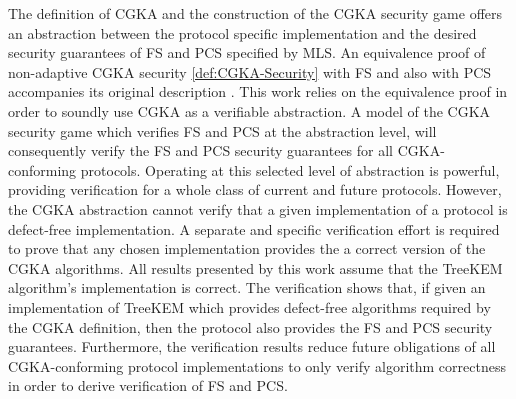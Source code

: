 The definition of CGKA and the construction of the CGKA security game offers an abstraction between the protocol specific implementation and the desired security guarantees of FS and PCS specified by MLS.
An equivalence proof of non-adaptive CGKA security \ref{def:CGKA-Security} with FS and also with PCS accompanies its original description \autocite{alwen2020security}.
This work relies on the equivalence proof in order to soundly use CGKA as a verifiable abstraction.
A model of the CGKA security game which verifies FS and PCS at the abstraction level, will consequently verify the FS and PCS security guarantees for all CGKA-conforming protocols.
Operating at this selected level of abstraction is powerful, providing verification for a whole class of current and future protocols.
However, the CGKA abstraction cannot verify that a given implementation of a protocol is defect-free implementation.
A separate and specific verification effort is required to prove that any chosen implementation provides the a correct version of the CGKA algorithms.
All results presented by this work assume that the TreeKEM algorithm's implementation is correct.
The verification shows that, if given an implementation of TreeKEM which provides defect-free algorithms required by the CGKA definition, then the protocol also provides the FS and PCS security guarantees.
Furthermore, the verification results reduce future obligations of all CGKA-conforming protocol implementations to only verify algorithm correctness in order to derive verification of FS and PCS.
